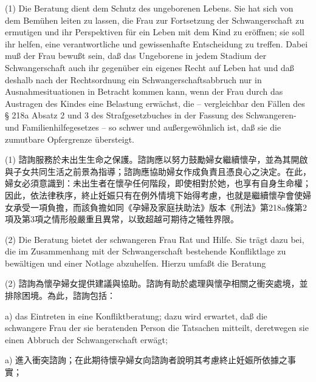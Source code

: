 \documentclass[12pt]{article}
\begin{document}
\begin{sourcepara}[title={原文主文 II.3(1)}]
(1) Die Beratung dient dem Schutz des ungeborenen Lebens. Sie hat sich von dem Bemühen leiten zu lassen, die Frau zur Fortsetzung der Schwangerschaft zu ermutigen und ihr Perspektiven für ein Leben mit dem Kind zu eröffnen; sie soll ihr helfen, eine verantwortliche und gewissenhafte Entscheidung zu treffen. Dabei muß der Frau bewußt sein, daß das Ungeborene in jedem Stadium der Schwangerschaft auch ihr gegenüber ein eigenes Recht auf Leben hat und daß deshalb nach der Rechtsordnung ein Schwangerschaftsabbruch nur in Ausnahmesituationen in Betracht kommen kann, wenn der Frau durch das Austragen des Kindes eine Belastung erwächst, die -- vergleichbar den Fällen des § 218a Absatz 2 und 3 des Strafgesetzbuches in der Fassung des Schwangeren- und Familienhilfegesetzes -- so schwer und außergewöhnlich ist, daß sie die zumutbare Opfergrenze übersteigt.
\end{sourcepara}
\begin{transpara}
(1) 諮詢服務於未出生生命之保護。諮詢應以努力鼓勵婦女繼續懷孕，並為其開啟與子女共同生活之前景為指導；諮詢應協助婦女作成負責且憑良心之決定。在此，婦女必須意識到：未出生者在懷孕任何階段，即使相對於她，也享有自身生命權；因此，依法律秩序，終止妊娠只有在例外情境下始得考慮，也就是繼續懷孕會使婦女承受一項負擔，而該負擔如同《孕婦及家庭扶助法》版本《刑法》第218a條第2項及第3項之情形般嚴重且異常，以致超越可期待之犧牲界限。
\end{transpara}

\begin{sourcepara}[title={原文主文 II.3(2)}]
(2) Die Beratung bietet der schwangeren Frau Rat und Hilfe. Sie trägt dazu bei, die im Zusammenhang mit der Schwangerschaft bestehende Konfliktlage zu bewältigen und einer Notlage abzuhelfen. Hierzu umfaßt die Beratung
\end{sourcepara}
\begin{transpara}
(2) 諮詢為懷孕婦女提供建議與協助。諮詢有助於處理與懷孕相關之衝突處境，並排除困境。為此，諮詢包括：
\end{transpara}

\begin{sourcepara}[title={原文主文 II.3(2)a}]
a) das Eintreten in eine Konfliktberatung; dazu wird erwartet, daß die schwangere Frau der sie beratenden Person die Tatsachen mitteilt, deretwegen sie einen Abbruch der Schwangerschaft erwägt;
\end{sourcepara}
\begin{transpara}
a) 進入衝突諮詢；在此期待懷孕婦女向諮詢者說明其考慮終止妊娠所依據之事實；
\end{transpara}
\end{document}
